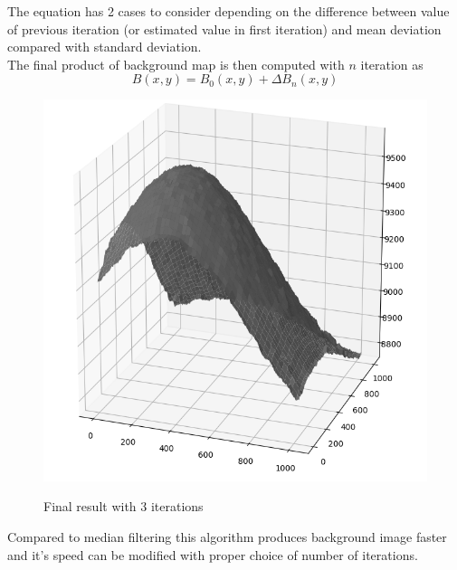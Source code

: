 \documentclass[12pt, a4paper, oneside]{book}
\begin{document}
The equation has 2 cases to consider depending on the difference between value of previous iteration (or estimated value in first iteration) and mean deviation compared with standard deviation.\\
The final product of background map is then computed with $n$ iteration as
\begin{equation}
    B(x,y) = B_0(x,y) + \Delta B_n(x,y)
\end{equation}

\begin{figure}[!hbt]
    \begin{center}
        \includegraphics[scale=1.50]{images/3_iter_sigma.png}
        \label{img:background_initial_guess}
        \caption{Final result with 3 iterations}
    \end{center}
\end{figure}

Compared to median filtering this algorithm produces background image faster and it's speed can be modified with proper choice of number of iterations.
\end{document}
